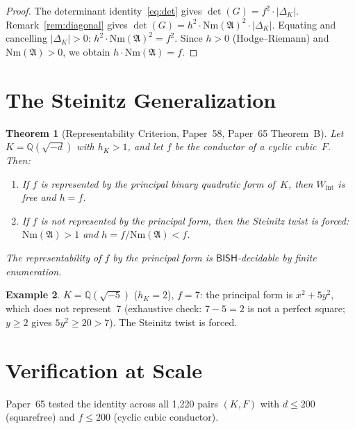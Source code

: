 \documentclass[11pt]{article}
\theoremstyle{plain}
\newtheorem{theorem}{Theorem}[section]
\theoremstyle{definition}
\newtheorem{example}[theorem]{Example}
\theoremstyle{remark}
\newcommand{\Q}{\mathbb{Q}}
\newcommand{\fA}{\mathfrak{A}}
\newcommand{\Nm}{\mathrm{Nm}}
\newcommand{\BISH}{\mathsf{BISH}}
\begin{document}
\begin{proof}
The determinant identity~\eqref{eq:det} gives
$\det(G) = f^2 \cdot |\Delta_K|$.
Remark~\ref{rem:diagonal} gives
$\det(G) = h^2 \cdot \Nm(\fA)^2 \cdot |\Delta_K|$.
Equating and cancelling $|\Delta_K| > 0$:
$h^2 \cdot \Nm(\fA)^2 = f^2$.
Since $h > 0$ (Hodge--Riemann) and $\Nm(\fA) > 0$,
we obtain $h \cdot \Nm(\fA) = f$.
\end{proof}


\section{The Steinitz Generalization}\label{sec:steinitz}

\begin{theorem}[Representability Criterion,
  Paper~58, Paper~65 Theorem~B]\label{thm:rep}
Let $K = \Q(\sqrt{-d})$ with $h_K > 1$, and let $f$ be the
conductor of a cyclic cubic~$F$.  Then:
\begin{enumerate}[label=(\roman*)]
\item If $f$ is represented by the principal binary quadratic
  form of~$K$, then $W_{\mathrm{int}}$ is free and $h = f$.
\item If $f$ is not represented by the principal form, then
  the Steinitz twist is forced: $\Nm(\fA) > 1$ and
  $h = f / \Nm(\fA) < f$.
\end{enumerate}
The representability of $f$ by the principal form is
$\BISH$-decidable by finite enumeration.
\end{theorem}

\begin{example}\label{ex:steinitz}
$K = \Q(\sqrt{-5})$ ($h_K = 2$), $f = 7$: the principal form is
$x^2 + 5y^2$, which does not represent~$7$ (exhaustive check:
$7 - 5 = 2$ is not a perfect square; $y \ge 2$ gives
$5y^2 \ge 20 > 7$).  The Steinitz twist is forced.
\end{example}


\section{Verification at Scale}\label{sec:scale}

Paper~65 \cite{Paper65} tested the identity across all 1{,}220
pairs $(K, F)$ with $d \le 200$ (squarefree) and $f \le 200$
(cyclic cubic conductor).
\end{document}
